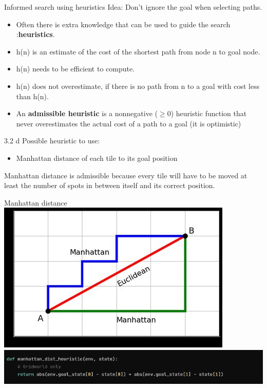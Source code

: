 \documentclass[11pt]{beamer}
\begin{document}
\begin{frame}{Informed search using heuristics}
Idea: Don't ignore the goal when selecting paths. \pause
\begin{itemize}
	\item Often there is extra knowledge that can be used to guide the search :\textbf{heuristics}. \pause
	\item h(n) is an estimate of the cost of the shortest path from node n to goal node. \pause
	\item h(n) needs to be efficient to compute. \pause
	\item h(n) does not overestimate, if there is no path from n to a goal with cost less than h(n). \pause
	\item An \textbf{admissible heuristic} is a nonnegative ($\geq 0$) heuristic function that never overestimates the actual cost of a path to a goal (it is optimistic)
\end{itemize}
\end{frame}

\begin{frame}{3.2 d}
Possible heuristic to use: \pause
\begin{itemize}
	\item Manhattan distance of each tile to its goal position \pause
\end{itemize}
Manhattan distance is admissible because every tile will have to be moved at least the number of spots in between itself and its correct position.
\end{frame}

\begin{frame}{Manhattan distance}
\includegraphics[scale=0.3]{manhattan_distance.jpeg}\\
\includegraphics[scale=0.4]{32dcode.png}
\end{frame}
\end{document}
